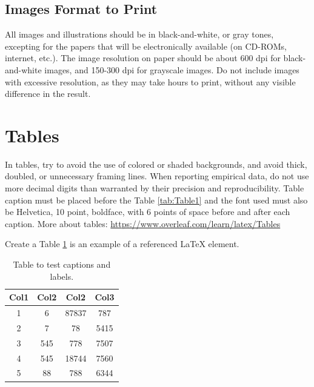 \documentclass[12pt]{article}
\begin{document}
\subsection{Images Format to Print}

All images and illustrations should be in black-and-white, or gray tones,
excepting for the papers that will be electronically available (on CD-ROMs,
internet, etc.). The image resolution on paper should be about 600 dpi for
black-and-white images, and 150-300 dpi for grayscale images.  Do not include
images with excessive resolution, as they may take hours to print, without any
visible difference in the result. 


\section{Tables}

In tables, try to avoid the use of colored or shaded backgrounds, and avoid
thick, doubled, or unnecessary framing lines. When reporting empirical data,
do not use more decimal digits than warranted by their precision and
reproducibility. Table caption must be placed before the Table \ref{tab:Table1}
and the font used must also be Helvetica, 10 point, boldface, with 6 points of
space before and after each caption. More about tables: \url{https://www.overleaf.com/learn/latex/Tables}

\begin{table}[ht]
\centering
\caption{Variables to be considered on the evaluation of interaction techniques}
\label{tab:Table1}
\end{table}

Create a Table \ref{tab:Table2} is an example of a referenced \LaTeX{} element.

\begin{table}[ht]
\centering
\begin{tabular}{||c c c c||} 
 \hline
 Col1 & Col2 & Col2 & Col3 \\ [0.5ex] 
 \hline\hline
 1 & 6 & 87837 & 787 \\ 
 2 & 7 & 78 & 5415 \\
 3 & 545 & 778 & 7507 \\
 4 & 545 & 18744 & 7560 \\
 5 & 88 & 788 & 6344 \\ [1ex] 
 \hline
\end{tabular}
\caption{Table to test captions and labels.}
\label{tab:Table2}
\end{table}
\end{document}
